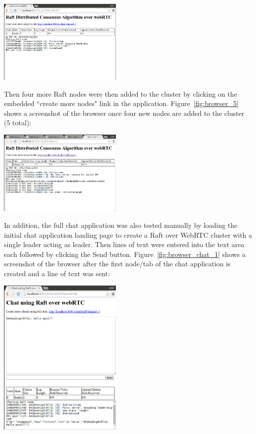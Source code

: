 \documentclass[9pt]{extarticle}
\begin{document}
\begin{multicols}{2}
\begin{center}
    \includegraphics[width=0.45\textwidth]{imgs/browser_1.png}
    \label{fig:browser_1}
\end{center}

Then four more Raft nodes were then added to the cluster by clicking
on the embedded ``create more nodes" link in the application.
Figure~\ref{fig:browser_5} shows a screenshot of the browser once four
new nodes are added to the cluster (5 total):

\begin{center}
    \includegraphics[width=0.45\textwidth]{imgs/browser_5.png}
    \label{fig:browser_5}
\end{center}

In addition, the full chat application was also tested manually by
loading the initial chat application landing page to create a Raft
over WebRTC cluster with a single leader acting as leader. Then lines
of text were entered into the text area each followed by clicking the
Send button. Figure~\ref{fig:browser_chat_1} shows a screenshot of the
browser after the first node/tab of the chat application is created
and a line of text was sent:

\begin{center}
    \includegraphics[width=0.45\textwidth]{imgs/chat_1a.png}
    \label{fig:browser_chat_1}
\end{center}


\end{multicols}
\end{document}
